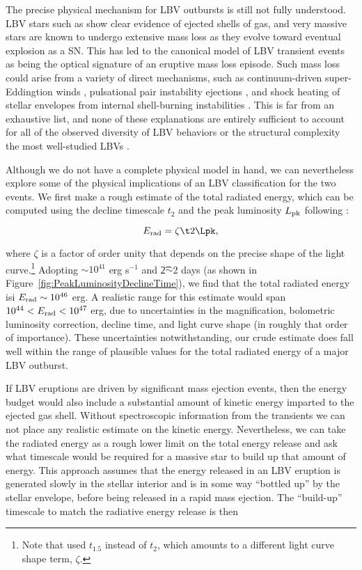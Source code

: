 The precise physical mechanism for LBV outbursts is still not fully
understood.  LBV stars such as \etacar show clear evidence of ejected
shells of gas, and very massive stars are known to undergo extensive
mass loss as they evolve toward eventual explosion as a SN.  This has
led to the canonical model of LBV transient events as being the
optical signature of an eruptive mass loss episode.  Such mass loss
could arise from a variety of direct mechanisms, such as
continuum-driven super-Eddingtion winds \citep{Smith:2006},
pulsational pair instability ejections \citep{Woosley:2007}, and shock
heating of stellar envelopes from internal shell-burning instabilities
\citep{Dessart:2010}.  This is far from an exhaustive list, and none
of these explanations are entirely sufficient to account for all of
the observed diversity of LBV behaviors or the structural complexity
the most well-studied LBVs \citep[e.g.][]{Smith:2011b, Kochanek:2012}.

Although we do not have a complete physical model in hand, we can
nevertheless explore some of the physical implications of an LBV
classification for the two \spock events.  We first make a rough
estimate of the total radiated energy, which can be computed using the
decline timescale $t_2$ and the peak luminosity $L_{\rm pk}$ following
\citet{Smith:2011b}:

\begin{equation}
  \label{eqn:Erad}
  E_{\rm rad} = \zeta \t2 \Lpk,
\end{equation}

\noindent where $\zeta$ is a factor of order unity that depends on the
precise shape of the light curve.\footnote{Note that
  \citet{Smith:2011b} used $t_{1.5}$ instead of $t_2$, which amounts
  to a different light curve shape term, $\zeta$.}  Adopting
\Lpk$\sim10^{41}$ erg s$^{-1}$ and \t2$\sim$2 days (as shown in
Figure~\ref{fig:PeakLuminosityDeclineTime}), we find that the total
radiated energy isi $E_{\rm rad}\sim10^{46}$ erg.  A realistic range
for this estimate would span $10^{44}<E_{\rm rad}<10^{47}$ erg, due to
uncertainties in the magnification, bolometric luminosity correction,
decline time, and light curve shape (in roughly that order of
importance). These uncertainties notwithstanding, our crude estimate
does fall well within the range of plausible values for the total
radiated energy of a major LBV outburst.

If LBV eruptions are driven by significant mass ejection events, then
the energy budget would also include a substantial amount of kinetic
energy imparted to the ejected gas shell. Without spectroscopic
information from the \spock transients we can not place any realistic
estimate on the kinetic energy. Nevertheless, we can take the radiated
energy as a rough lower limit on the total energy release and ask what
timescale would be required for a massive star to build up that amount
of energy. This approach assumes that the energy released in an LBV
eruption is generated slowly in the stellar interior and is in some
way ``bottled up'' by the stellar envelope, before being released in a
rapid mass ejection.  The ``build-up'' timescale to match the
radiative energy release is then

